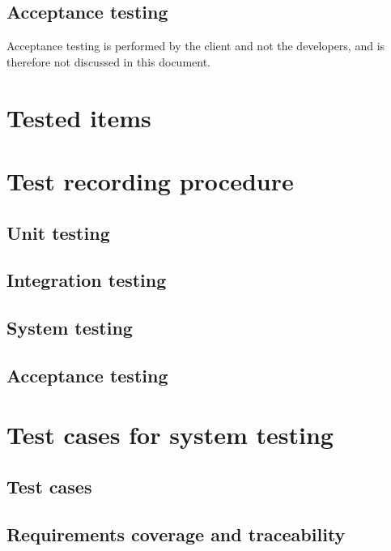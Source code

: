 \documentclass[12pt,titlepage,bibliography=totoc]{article}
\begin{document}
\subsection{Acceptance testing}

Acceptance testing is performed by the client and not the developers, and is
therefore not discussed in this document.


\section{Tested items}
\label{sec:tested-items}

%
%


\section{Test recording procedure}
\label{sec:test-recording-procedure}
\subsection{Unit testing}
\subsection{Integration testing}
\subsection{System testing}
\subsection{Acceptance testing}


\section{Test cases for system testing}
\label{sec:test-cases-for-system-testing}
\subsection{Test cases}
\subsection{Requirements coverage and traceability}
\end{document}
